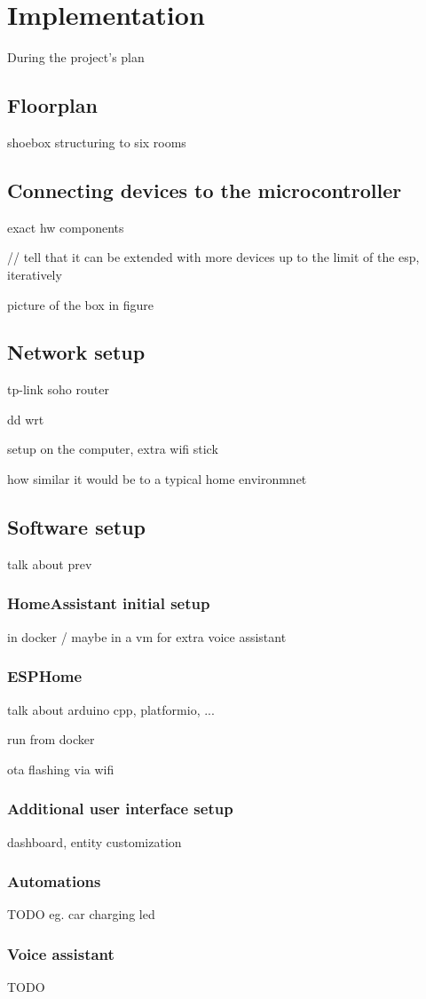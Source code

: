 \chapter{Implementation}

During the project's plan 

\section{Floorplan}

shoebox structuring to six rooms

\section{Connecting devices to the microcontroller}

exact hw components

// tell that it can be extended with more devices up to the limit of the esp, iteratively

picture of the box in figure

\section{Network setup}

tp-link soho router

dd wrt

setup on the computer, extra wifi stick

how similar it would be to a typical home environmnet

\section{Software setup}

talk about prev

\subsection{HomeAssistant initial setup}

in docker / maybe in a vm for extra voice assistant

\subsection{ESPHome}

talk about arduino cpp, platformio, ...

run from docker

ota flashing via wifi

\subsection{Additional user interface setup}

dashboard, entity customization

\subsection{Automations}

TODO eg. car charging led

\subsection{Voice assistant}

TODO
